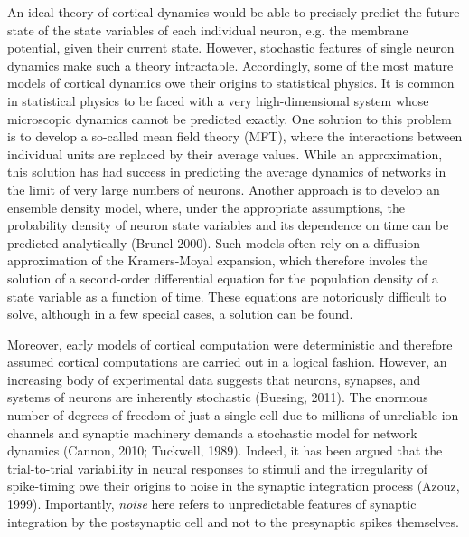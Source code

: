 \documentclass{ucetd}
\begin{document}
An ideal theory of cortical dynamics would be able to precisely predict the future state of the state variables of each individual neuron, e.g. the membrane potential, given their current state. However, stochastic features of single neuron dynamics make such a theory intractable. Accordingly, some of the most mature models of cortical dynamics owe their origins to statistical physics. It is common in statistical physics to be faced with a very high-dimensional system whose microscopic dynamics cannot be predicted exactly. One solution to this problem is to develop a so-called mean field theory (MFT), where the interactions between individual units are replaced by their average values. While an approximation, this solution has had success in predicting the average dynamics of networks in the limit of very large numbers of neurons. Another approach is to develop an ensemble density model, where, under the appropriate assumptions, the probability density of neuron state variables and its dependence on time can be predicted analytically (Brunel 2000). Such models often rely on a diffusion approximation of the Kramers-Moyal expansion, which therefore involes the solution of a second-order differential equation for the population density of a state variable as a function of time. These equations are notoriously difficult to solve, although in a few special cases, a solution can be found.

Moreover, early models of cortical computation were deterministic and therefore assumed cortical computations are carried out in a logical fashion. However, an increasing body of experimental data suggests that neurons, synapses, and systems of neurons are inherently stochastic (Buesing, 2011). The enormous number of degrees of freedom of just a single cell due to millions of unreliable ion channels and synaptic machinery demands a stochastic model for network dynamics (Cannon, 2010; Tuckwell, 1989). Indeed, it has been argued that the trial-to-trial variability in neural responses to stimuli and the irregularity of spike-timing owe their origins to noise in the synaptic integration process (Azouz, 1999). Importantly, \emph{noise} here refers to unpredictable features of synaptic integration by the postsynaptic cell and not to the presynaptic spikes themselves. 
\end{document}
